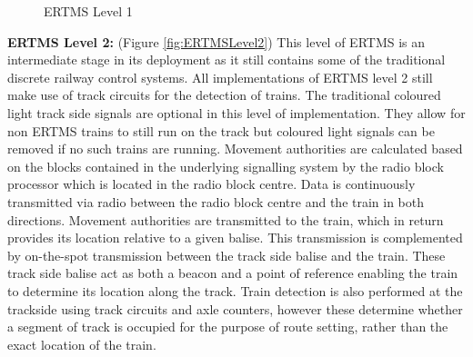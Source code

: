 \begin{center}
\begin{figure}[h!]



 \caption{ERTMS Level 1}
\label{fig:ERTMSLevel1}
\end{figure}
\end{center}

\textbf{ERTMS Level 2:}  (Figure \ref{fig:ERTMSLevel2}) This level of ERTMS is an intermediate stage in its deployment as it still contains some of the traditional discrete railway control systems. All implementations of ERTMS level 2 still make use of track circuits for the detection of trains. The traditional coloured light track side signals are optional in this level of implementation. They allow for non ERTMS trains to still run on the  track but coloured light signals can be removed if no such trains are running. Movement authorities are calculated based on the blocks contained in the underlying signalling system by the radio block processor which is located in the radio block centre. Data is continuously transmitted via radio between the radio block centre and the train in both directions. Movement authorities are transmitted to the train, which in return provides its location relative to a given balise. This transmission is complemented by on-the-spot transmission between the track side balise and the train. These track side balise act as both a beacon and a point of reference enabling the train to determine its location along the track. Train detection is also performed at the trackside using track circuits and axle counters, however these determine whether a segment of track is occupied for the purpose of route setting, rather than the exact location of the train. \



